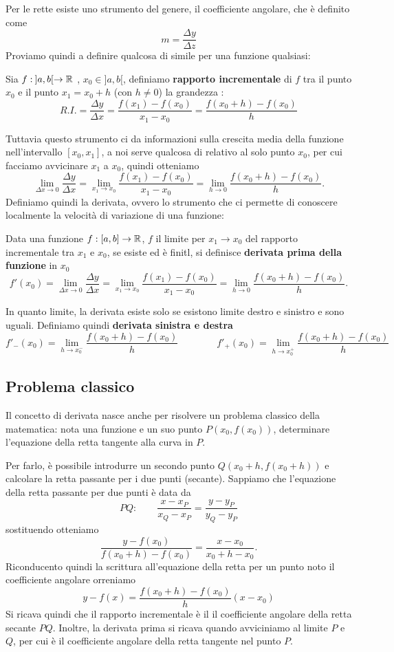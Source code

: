 Per le rette esiste uno strumento del genere, il coefficiente angolare, che è definito come 
\[m=\frac{\Delta y}{\Delta z}\]
Proviamo quindi a definire qualcosa di simile per una funzione qualsiasi:
\begin{boxdef}
    Sia $f:\:]a,b[\to \mathbb{R}$ , $x_0\in ]a,b[$, definiamo \textbf{rapporto incrementale} di $f$ tra il punto $x_0$ e il punto $x_1=x_0+h$ (con $h\neq 0$) la grandezza :
    \[R.I.=\frac{\Delta y}{\Delta x}=\frac{f(x_1)-f(x_0)}{x_1-x_0}=\frac{f(x_0+h)-f(x_0)}{h}\]
\end{boxdef}
Tuttavia questo strumento ci da informazioni sulla crescita media della funzione nell'intervallo $[x_0,x_1]$, a noi serve qualcosa di relativo al solo punto $x_0$, per cui facciamo avvicinare $x_1$ a $x_0$, quindi otteniamo
\[\lim_{\Delta x \to 0}\frac{\Delta y}{\Delta x}=\lim_{x_1\to x_0}\frac{f(x_1)-f(x_0)}{x_1-x_0}=\lim_{h\to 0}\frac{f(x_0+h)-f(x_0)}{h}.\]
Definiamo quindi la derivata, ovvero lo strumento che ci permette di conoscere localmente la velocità di variazione di una funzione:
\begin{boxdef}[Derivata]
    Data una funzione $f:[a,b]\to\mathbb{R}$, $f$ il limite per $x_1\to x_0$ del rapporto incrementale tra $x_1$ e $x_0$, se esiste ed è finitl, si definisce \textbf{derivata prima della funzione}  in $x_0$
    \[f'(x_0)=\lim_{\Delta x \to 0}\frac{\Delta y}{\Delta x}=\lim_{x_1\to x_0}\frac{f(x_1)-f(x_0)}{x_1-x_0}=\lim_{h\to 0}\frac{f(x_0+h)-f(x_0)}{h}.\]
\end{boxdef}
In quanto limite, la derivata esiste solo se esistono limite destro e sinistro e sono uguali. Definiamo quindi \textbf{derivata sinistra e destra}
\[f'_-(x_0)=\lim_{h\to x_0^-}\frac{f(x_0+h)-f(x_0)}{h}\qquad \qquad f'_+(x_0)=\lim_{h\to x_0^+}\frac{f(x_0+h)-f(x_0)}{h}\]
\subsection{Problema classico}
Il concetto di derivata nasce anche per risolvere un problema classico della matematica: nota una funzione e un suo punto $P(x_0,f(x_0))$, determinare l'equazione della retta tangente alla curva in $P$. 

Per farlo, è possibile introdurre un secondo punto $Q(x_0+h, f(x_0+h))$ e calcolare la retta passante per i due punti (secante). Sappiamo che l'equazione della retta passante per due punti è data da
\[PQ:\qquad \frac{x-x_P}{x_Q-x_P}=\frac{y-y_P}{y_Q-y_P}\]
sostituendo otteniamo
\[\frac{y-f(x_0)}{f(x_0+h)-f(x_0)}=\frac{x-x_0}{x_0+h-x_0}.\]
Riconducento quindi la scrittura all'equazione della retta per un punto noto il coefficiente angolare orreniamo
\[y-f(x)=\frac{f(x_0+h)-f(x_0)}{h}(x-x_0)\]
Si ricava quindi che il rapporto incrementale è il il coefficiente angolare della retta secante $PQ$. Inoltre, la derivata prima si ricava quando avviciniamo al limite $P$ e $Q$, per cui è il coefficiente angolare della retta tangente nel punto $P$.
